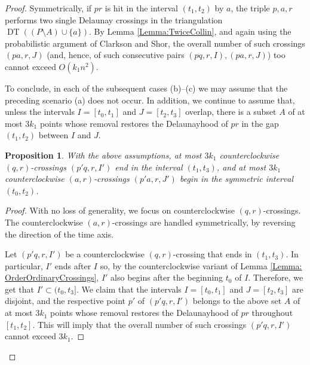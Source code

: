 \documentclass[letter,11pt]{article}
\newtheorem{proposition}[theorem]{Proposition}
\def\DT{\mathop{\mathrm{DT}}}
\begin{document}
\begin{proof}
Symmetrically, if $pr$ is hit in the interval $(t_1,t_2)$ by $a$, the triple $p,a,r$ performs two single Delaunay crossings in the triangulation $\DT((P\setminus A)\cup \{a\})$. By Lemma \ref{Lemma:TwiceCollin}, and again using the probabilistic argument of Clarkson and Shor, the overall number of such crossings $(pa,r,J)$ (and, hence, of such consecutive pairs $(pq,r,I),(pa,r,J)$) too cannot exceed $O(k_1n^2)$.


\bigskip
To conclude, in each of the subsequent cases (b)--(c) we may assume that the preceding scenario (a) does not occur. In addition, we continue to assume that, unless the intervals $I=[t_0,t_1]$ and $J=[t_2,t_3]$ overlap, there is a subset $A$ of at most $3k_1$ points whose removal restores the Delaunayhood of $pr$ in the gap $(t_1,t_2)$ between $I$ and $J$. 


\begin{proposition}\label{Prop:Balanced}
With the above assumptions, at most $3k_1$ counterclockwise $(q,r)$-crossings $(p'q,r,I')$ end in the interval $(t_1,t_3)$, and at most $3k_1$ counterclockwise $(a,r)$-crossings $(p'a,r,J')$ begin in the symmetric interval $(t_0,t_2)$.
\end{proposition}
\begin{proof}
With no loss of generality, we focus on counterclockwise $(q,r)$-crossings. The counterclockwise $(a,r)$-crossings are handled symmetrically, by reversing the direction of the time axis. 

Let $(p'q,r,I')$ be a counterclockwise $(q,r)$-crossing that ends in $(t_1,t_3)$. In particular, $I'$ ends after $I$ so, by the counterclockwise variant of Lemma \ref{Lemma: OrderOrdinaryCrossings}, $I'$ also begins after the beginning $t_0$ of $I$. Therefore, we get that $I'\subset (t_0,t_3]$.
We claim that the intervals $I=[t_0,t_1]$ and $J=[t_2,t_3]$ are disjoint, and the respective point $p'$ of $(p'q,r,I')$ belongs to the above set $A$ of at most $3k_1$ points whose removal restores the Delaunayhood of $pr$ throughout $[t_1,t_2]$. This will imply that the overall number of such crossings $(p'q,r,I')$ cannot exceed $3k_1$. 


\end{proof}
\end{proof}
\end{document}
